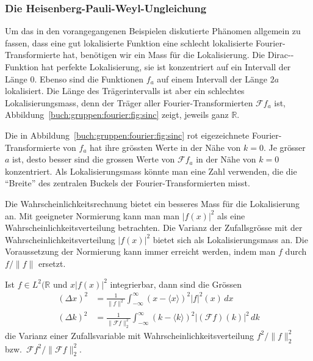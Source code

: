 %
%
\subsubsection{Die Heisenberg-Pauli-Weyl-Ungleichung}
Um das in den vorangegangenen Beispielen diskutierte Phänomen allgemein
zu fassen, dass eine gut lokalisierte Funktion eine schlecht lokalisierte
Fourier-Transformierte hat, benötigen wir ein Mass für die Lokalisierung.
Die Dirac-\textdelta-Funktion hat perfekte Lokalisierung, sie ist 
konzentriert auf ein Intervall der Länge $0$.
Ebenso sind die Funktionen $f_a$ auf einem Intervall der Länge $2a$
lokalisiert.
Die Länge des Trägerintervalls ist aber ein schlechtes Lokalisierungsmass,
denn der Träger aller Fourier-Transformierten $\mathscr{F}f_a$ ist,
Abbildung~\ref{buch:gruppen:fourier:fig:sinc} zeigt,
jeweils ganz $\mathbb{R}$.

Die in Abbildung~\ref{buch:gruppen:fourier:fig:sinc}
rot eigezeichnete Fourier-Transformierte von $f_a$ hat ihre grössten 
Werte in der Nähe von $k=0$.
Je grösser $a$ ist, desto besser sind die grossen Werte von $\mathscr{F}f_a$
in der Nähe von $k=0$ konzentriert.
Als Lokalisierungsmass könnte man eine Zahl verwenden, die die ``Breite''
des zentralen Buckels der Fourier-Transformierten misst.

Die Wahrscheinlichkeitsrechnung bietet ein besseres Mass für die
Lokalisierung an.
Mit geeigneter Normierung kann man man $|f(x)|^2$ als eine
Wahrscheinlichkeitsverteilung betrachten.
Die Varianz der Zufallsgrösse mit der Wahrscheinlichkeitsverteilung
$|f(x)|^2$ bietet sich als Lokalisierungsmass an.
Die Voraussetzung der Normierung kann immer erreicht werden, indem man
$f$ durch $f/\|f\|$ ersetzt.


\begin{definition}
Ist $f\in L^2(\mathbb{R}$ und $x|f(x)|^2$ integrierbar, dann sind
die Grössen
\begin{align*}
(\Delta x)^2
&=
\frac{1}{\|f\|^2}
\int_{-\infty}^\infty
(x-\langle x\rangle)^2
|f|^2(x)
\,dx
\\
(\Delta k)^2
&=
\frac{1}{\|\mathscr{F}f\|_2^2}
\int_{-\infty}^\infty
(k-\langle k\rangle)^2
|(\mathscr{F}f)(k)|^2
\,dk
\end{align*}
die Varianz einer Zufallsvariable mit Wahrscheinlichkeitsverteilung
$f^2/\|f\|_2^2$ bzw.~$\mathscr{F}f^2/\|\mathscr{F}f\|_2^2$.
\end{definition}

